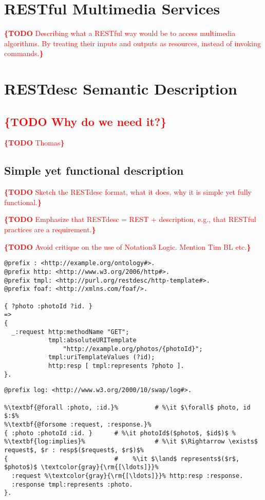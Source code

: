 \documentclass[runningheads,a4paper, twocolumn]{llncs}
\newcommand{\todo}[1]{\noindent\textcolor{red}{{\bf \{TODO} #1{\bf \}}}}
\begin{document}
\section{RESTful Multimedia Services}
\label{RESTfulServices}
\todo{Describing what a RESTful way would be to access multimedia algorithms. By treating their inputs and outputs as resources, instead of invoking commands.}

\section{RESTdesc Semantic Description}
\label{RESTdesc}
\subsection{\todo{Why do we need it?}}
\todo{Thomas}

\subsection{Simple yet functional description}
\todo{Sketch the RESTdesc format, what it does, why it is simple yet fully functional.}

\todo{Emphasize that RESTdesc = REST + description, e.g., that RESTful practices are a requirement.}

\todo{Avoid critique on the use of Notation3 Logic. Mention Tim BL etc.}


\begin{lstlisting}[caption=RESTdesc description of photo retrieval,
                   label=lst:PhotoGet, float, escapechar=\%]
@prefix : <http://example.org/ontology#>.
@prefix http: <http://www.w3.org/2006/http#>.
@prefix tmpl: <http://purl.org/restdesc/http-template#>.
@prefix foaf: <http://xmlns.com/foaf/>.

{ ?photo :photoId ?id. }
=>
{
  _:request http:methodName "GET";
            tmpl:absoluteURITemplate
                "http://example.org/photos/{photoId}";
            tmpl:uriTemplateValues (?id);
            http:resp [ tmpl:represents ?photo ].
}.
\end{lstlisting}

\begin{lstlisting}[caption=\autoref{lst:PhotoGet} with explicit quantifiers,
                   label=lst:PhotoGetQuantifiers, float, escapechar=\%]
@prefix log: <http://www.w3.org/2000/10/swap/log#>.

%\textbf{@forall :photo, :id.}%          # %\it $\forall$ photo, id $:$%
%\textbf{@forsome :request, :response.}%
{ :photo :photoId :id. }      # %\it photoId$($photo$, $id$)$ %
%\textbf{log:implies}%                   # %\it $\Rightarrow \exists$ request$, $r : resp$($request$, $r$)$%
{                             #    %\it $\land$ represents$($r$, $photo$)$ \textcolor{gray}{\rm{[\ldots]}}%
  :request %\textcolor{gray}{\rm{[\ldots]}}% http:resp :response.
  :response tmpl:represents :photo.
}.
\end{lstlisting}
\end{document}
